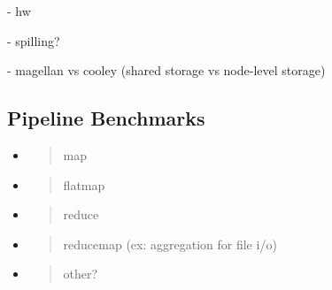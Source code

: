 - hw

- spilling?

- magellan vs cooley (shared storage vs node-level storage)

\subsection{Pipeline Benchmarks}\label{pipeline-benchmarks}

\begin{itemize}
	\item
	\begin{quote}
		map
	\end{quote}
	\item
	\begin{quote}
		flatmap
	\end{quote}
	\item
	\begin{quote}
		reduce
	\end{quote}
	\item
	\begin{quote}
		reducemap (ex: aggregation for file i/o)
	\end{quote}
	\item
	\begin{quote}
		other?
	\end{quote}
\end{itemize}